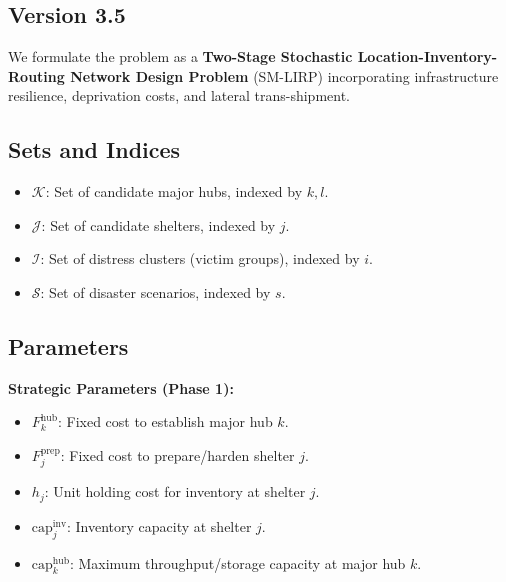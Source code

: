 \subsection{Version 3.5}
We formulate the problem as a \textbf{Two-Stage Stochastic Location-Inventory-Routing Network Design Problem} (SM-LIRP) incorporating infrastructure resilience, deprivation costs, and lateral trans-shipment.

\subsection{Sets and Indices}
\begin{itemize}
    \item $\mathcal{K}$: Set of candidate major hubs, indexed by $k, l$.
    \item $\mathcal{J}$: Set of candidate shelters, indexed by $j$.
    \item $\mathcal{I}$: Set of distress clusters (victim groups), indexed by $i$.
    \item $\mathcal{S}$: Set of disaster scenarios, indexed by $s$.
\end{itemize}

\subsection{Parameters}
\textbf{Strategic Parameters (Phase 1):}
\begin{itemize}
    \item $F_k^{\text{hub}}$: Fixed cost to establish major hub $k$.
    \item $F_j^{\text{prep}}$: Fixed cost to prepare/harden shelter $j$.
    \item $h_j$: Unit holding cost for inventory at shelter $j$.
    \item $\text{cap}_j^{\text{inv}}$: Inventory capacity at shelter $j$.
    \item $\text{cap}_k^{\text{hub}}$: Maximum throughput/storage capacity at major hub $k$.
\end{itemize}

